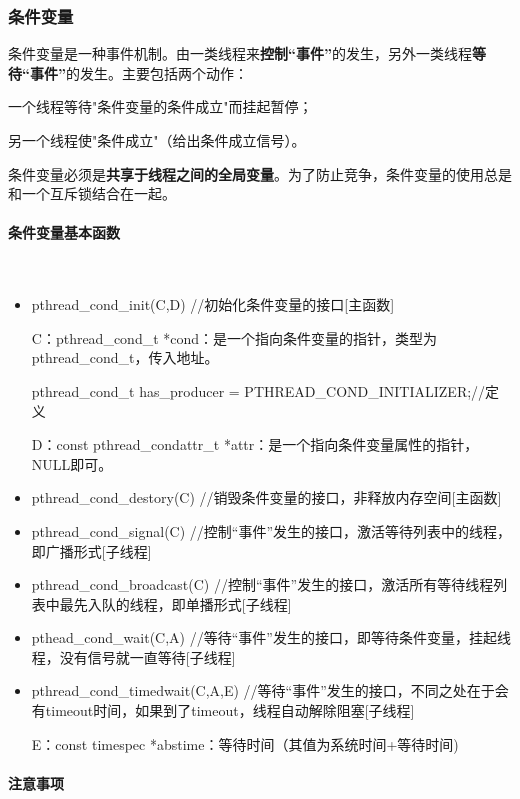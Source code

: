 \documentclass[UTF8]{article}%
\begin{document}
\subsubsection{条件变量}

条件变量是一种事件机制。由一类线程来\textbf{控制“事件”}的发生，另外一类线程\textbf{等待“事件”}的发生。主要包括两个动作：

一个线程等待"条件变量的条件成立"而挂起暂停；

另一个线程使"条件成立"（给出条件成立信号）。

条件变量必须是\textbf{共享于线程之间的全局变量}。为了防止竞争，条件变量的使用总是和一个互斥锁结合在一起。  

\paragraph{条件变量基本函数}~{}

\begin{itemize}
    \item pthread\_cond\_init(C,D) //初始化条件变量的接口[主函数]
    
    C：pthread\_cond\_t *cond：是一个指向条件变量的指针，类型为pthread\_cond\_t，传入地址。

    pthread\_cond\_t has\_producer = PTHREAD\_COND\_INITIALIZER;//定义

    D：const pthread\_condattr\_t *attr：是一个指向条件变量属性的指针，NULL即可。

    \item pthread\_cond\_destory(C) //销毁条件变量的接口，非释放内存空间[主函数]
    \item pthread\_cond\_signal(C) //控制“事件”发生的接口，激活等待列表中的线程，即广播形式[子线程]
    \item pthread\_cond\_broadcast(C) //控制“事件”发生的接口，激活所有等待线程列表中最先入队的线程，即单播形式[子线程]
    \item pthead\_cond\_wait(C,A) //等待“事件”发生的接口，即等待条件变量，挂起线程，没有信号就一直等待[子线程]
    \item pthread\_cond\_timedwait(C,A,E) //等待“事件”发生的接口，不同之处在于会有timeout时间，如果到了timeout，线程自动解除阻塞[子线程]
    
    E：const timespec *abstime：等待时间（其值为系统时间+等待时间)

\end{itemize}

\paragraph{注意事项}~{}
\end{document}
